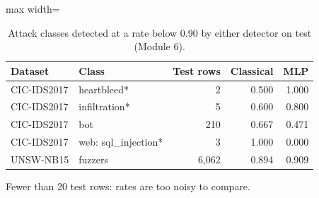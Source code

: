 \begin{table}[t]
\centering
\caption{Attack classes detected at a rate below 0.90 by either detector on test (Module 6).}
\label{tab:weak_classes}
\footnotesize
\setlength{\tabcolsep}{3.5pt}
\begin{adjustbox}{max width=\linewidth}
\begin{tabular}{llrrr}
\toprule
Dataset & Class & Test rows & Classical & MLP \\
\midrule
CIC-IDS2017 & heartbleed* & 2 & 0.500 & 1.000 \\
CIC-IDS2017 & infiltration* & 5 & 0.600 & 0.800 \\
CIC-IDS2017 & bot & 210 & 0.667 & 0.471 \\
CIC-IDS2017 & web: sql\_injection* & 3 & 1.000 & 0.000 \\
UNSW-NB15 & fuzzers & 6,062 & 0.894 & 0.909 \\
\bottomrule
\end{tabular}
\end{adjustbox}
\par\vspace{2pt}
\parbox{0.98\linewidth}{\scriptsize *Fewer than 20 test rows: rates are too noisy to compare.}
\end{table}
